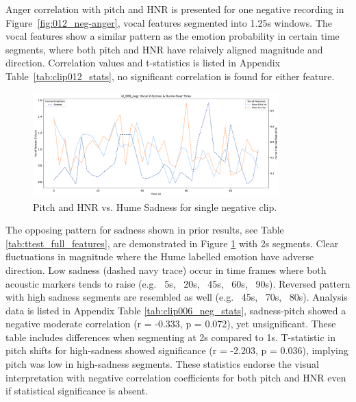 Anger correlation with pitch and HNR is presented for one negative recording in Figure~\ref{fig:012_neg-anger}, vocal features segmented into 1.25s windows. The vocal features show a similar pattern as the emotion probability in certain time segments, where both pitch and HNR have relaively aligned 
magnitude and direction. Correlation values and t-statistics is listed in Appendix Table~\ref{tab:clip012_stats}, no significant correlation is found for either feature. 

\begin{figure}[H]
    \centering
    \includegraphics[width=0.85\textwidth]{png/results/rq1_nr3/combined_zscore_hume_id_006_neg_7.pdf}
    \caption{Pitch and HNR vs. Hume Sadness for single negative clip.}
    \label{fig:006_neg-sadness}
\end{figure}

The opposing pattern for sadness shown in prior results, see Table \ref{tab:ttest_full_features},  are demonstrated in Figure \ref{fig:006_neg-sadness} with 2s segments. Clear fluctuations in magnitude where the Hume labelled emotion have adverse direction. 
Low sadness (dashed navy trace) occur in time frames where both acoustic markers tends to raise (e.g. ~5s, ~20s, ~45s, ~60s, ~90s). 
Reversed pattern with high sadness segments are resembled as well (e.g. ~45s, ~70s, ~80s). 
Analysis data is listed in Appendix Table \ref{tab:clip006_neg_stats}, sadness-pitch showed a negative moderate correlation (r = -0.333, p = 0.072), yet unsignificant. These table includes differences when segmenting at 2s compared to 1s. 
T-statistic in pitch shifts for high-sadness showed significance (r = -2.203, p = 0.036), implying pitch was low in high-sadness segments. These statistics endorse the visual interpretation with negative correlation coefficients for both pitch and HNR even if statistical significance is absent. 


